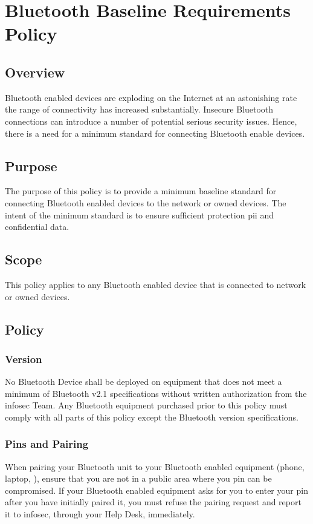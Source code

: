 \chapter{Bluetooth Baseline Requirements Policy}
\CommonIntroduction
\section{Overview}
Bluetooth enabled devices are exploding on the Internet at an astonishing rate the range of connectivity has increased substantially.  
Insecure Bluetooth connections can introduce a number of potential serious security issues.  
Hence, there is a need for a minimum standard for connecting Bluetooth enable devices.
\section{Purpose}
The purpose of this policy is to provide a minimum baseline standard for connecting Bluetooth enabled devices to the \CompanyName{} network or \CompanyName{} owned devices.   
The intent of the minimum standard is to ensure sufficient protection \gls{pii} and confidential \CompanyName{} data.
\section{Scope}
This policy applies to any Bluetooth enabled device that is connected to \CompanyName{} network or owned devices. 
\section{Policy}
\subsection{Version}
No Bluetooth Device shall be deployed on \CompanyName{} equipment that does not meet a minimum of Bluetooth v2.1 specifications without written authorization from the \gls{infosec} Team.  
Any Bluetooth equipment purchased prior to this policy must comply with all parts of this policy except the Bluetooth version specifications.
\subsection{Pins and Pairing}
When pairing your Bluetooth unit to your Bluetooth enabled equipment (\ie phone, laptop, \etc), ensure that you are not in a public area where you \gls{pin} can be compromised. 
If your Bluetooth enabled equipment asks for you to enter your pin after you have initially paired it, you must refuse the pairing request and report it to \gls{infosec}, through your Help Desk, immediately.  
